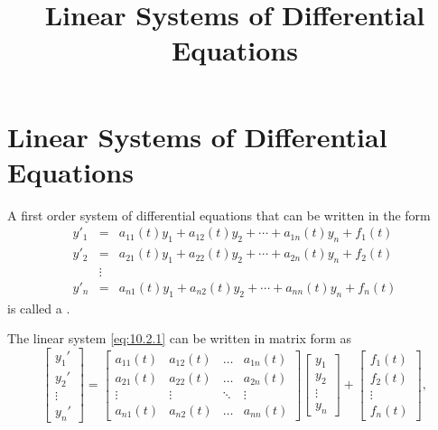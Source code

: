 \documentclass{ximera}
\title{Linear Systems of Differential Equations}%
\begin{document}
\begin{abstract}

\end{abstract}

\maketitle

\section*{Linear Systems of Differential Equations}

A  first order system of  differential equations that can be written in
the form
\begin{equation} \label{eq:10.2.1}
\begin{array}{ccl}
y'_1&=&a_{11}(t)y_1+a_{12}(t)y_2+\cdots+a_{1n}(t)y_n+f_1(t)\\
y'_2&=&a_{21}(t)y_1+a_{22}(t)y_2+\cdots+a_{2n}(t)y_n+f_2(t)\\
&\vdots\\
y'_n&
=&a_{n1}(t)y_1+a_{n2}(t)y_2+\cdots+a_{nn}(t)y_n+f_n(t)\end{array}
\end{equation}
is called a .

The linear system \eqref{eq:10.2.1}  can be written in matrix form as
$$
\begin{bmatrix}y_1'\\y_2'\\\vdots\\y_n'\end{bmatrix}=\begin{bmatrix}a_{11}(t)&a_{12}(t)&\dots &a_{1n}(t)\\
a_{21}(t)&a_{22}(t)&\dots &a_{2n}(t)\\
\vdots &\vdots &\ddots &\vdots\\
a_{n1}(t)&a_{n2}(t)&\dots &a_{nn}(t)\end{bmatrix}\begin{bmatrix}y_1\\y_2\\\vdots\\y_n\end{bmatrix}+\begin{bmatrix}f_1(t)\\f_2(t)\\\vdots\\f_n(t)\end{bmatrix},
$$
\end{document}
